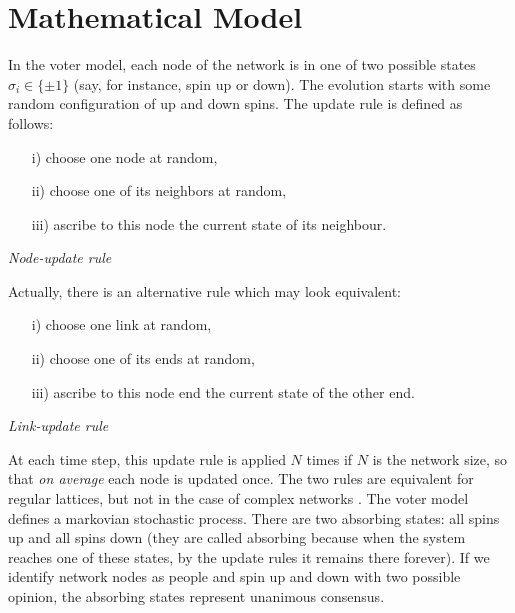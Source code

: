 \section{Mathematical Model}
In the voter model, each node of the network is in one of two possible states $\sigma_i \in \{\pm 1\}$ (say, for instance, spin up or down). The evolution starts with some random configuration of up and down spins. The update rule is defined as follows: 
\medskip
\newline
\begin{minipage}{0.8\textwidth}
\begin{itemize}
    \item[i)] choose one node at random,
    \item[ii)] choose one of its neighbors at random,
    \item[iii)] ascribe to this node the current state of its neighbour.
\end{itemize}
\end{minipage}
\hfill
\begin{minipage}{0.2\textwidth}
\vfill
    \textit{Node-update rule}
\vfill
\end{minipage}
\medskip
\newline
Actually, there is an alternative rule which may look equivalent:
\medskip
\newline
\begin{minipage}{0.8\textwidth}
\begin{itemize}
    \item[i)] choose one link at random,
    \item[ii)] choose one of its ends at random,
    \item[iii)] ascribe to this node end the current state of the other end.
\end{itemize}
\end{minipage}
\hfill
\begin{minipage}{0.2\textwidth}
\vfill
    \textit{Link-update rule}
\vfill
\end{minipage}
\medskip
\newline
At each time step, this update rule is applied $N$ times if $N$ is the network size, so that \textit{on average} each node is updated once. The two rules are equivalent for regular lattices, but not in the case of complex networks \cite{suchecki_analitical}. The voter model defines a markovian stochastic process. There are two absorbing states: all spins up and all spins down (they are called absorbing because when the system reaches one of these states, by the update rules it remains there forever). If we identify network nodes as people and spin up and down with two possible opinion, the absorbing states represent unanimous consensus. \\
